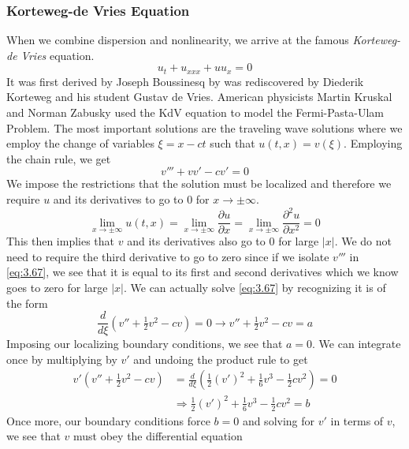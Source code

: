 \documentclass{article}
\newcommand{\pd}[2]{\frac{\partial #1}{\partial #2}}
\newcommand{\od}[2]{\frac{d #1}{d #2}}
\newcommand{\pdt}[2]{\frac{\partial ^2 #1}{\partial #2 ^2}}
\numberwithin{equation}{section}
\begin{document}
\subsubsection{Korteweg-de Vries Equation}
When we combine dispersion and nonlinearity, we arrive at the famous \textit{Korteweg-de Vries} equation.
\begin{equation}
    u_t+u_{xxx}+uu_x=0
\end{equation}
It was first derived by Joseph Boussinesq by was rediscovered by Diederik Korteweg and his student Gustav de Vries. American physicists Martin Kruskal and Norman Zabusky used the KdV equation to model the Fermi-Pasta-Ulam Problem. The most important solutions are the traveling wave solutions where we employ the change of variables $\xi =x-ct$ such that $u(t,x)=v(\xi)$. Employing the chain rule, we get 
\begin{equation}
    v''' + vv'-cv' = 0 \label{eq:3.67}
\end{equation}
We impose the restrictions that the solution must be localized and therefore we require $u$ and its derivatives to go to 0 for $x\rightarrow \pm \infty$. 
\begin{equation}
\lim_{x\rightarrow\pm\infty}u(t,x)=\lim_{x\rightarrow\pm\infty}\pd{u}{x}=\lim_{x\rightarrow\pm\infty}\pdt{u}{x}=0
\end{equation}
This then implies that $v$ and its derivatives also go to 0 for large $|x|$. We do not need to require the third derivative to go to zero since if we isolate $v'''$ in \eqref{eq:3.67}, we see that it is equal to its first and second derivatives which we know goes to zero for large $|x|$. We can actually solve \eqref{eq:3.67} by recognizing it is of the form 
\begin{equation*}
    \od{}{\xi}(v''+\tfrac{1}{2} v^2-cv)=0 \rightarrow v''+\tfrac{1}{2}v^2-cv = a
\end{equation*}
Imposing our localizing boundary conditions, we see that $a=0$. We can integrate once by multiplying by $v'$ and undoing the product rule to get 
\begin{equation}
\begin{split}
    v'(v''+\tfrac{1}{2}v^2-cv) &= \od{}{\xi}\left(\tfrac{1}{2}(v')^2+\tfrac{1}{6}v^3-\tfrac{1}{2}cv^2\right) =0 \\
    &\Rightarrow \tfrac{1}{2}(v')^2+\tfrac{1}{6}v^3-\tfrac{1}{2}cv^2 = b
    \end{split}
\end{equation}
Once more, our boundary conditions force $b=0$ and solving for $v'$ in terms of $v$, we see that $v$ must obey the differential equation 
\end{document}

